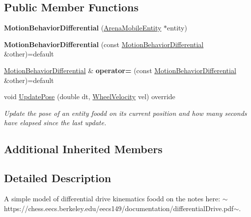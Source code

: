 \subsection*{Public Member Functions}
\begin{DoxyCompactItemize}
\item 
\mbox{\label{class_motion_behavior_differential_a8815791ac85212945862454560279d28}} 
{\bfseries Motion\+Behavior\+Differential} (\mbox{\hyperlink{class_arena_mobile_entity}{Arena\+Mobile\+Entity}} $\ast$entity)
\item 
\mbox{\label{class_motion_behavior_differential_aeaa480aac3de205e1d177c4b4ad73ed6}} 
{\bfseries Motion\+Behavior\+Differential} (const \mbox{\hyperlink{class_motion_behavior_differential}{Motion\+Behavior\+Differential}} \&other)=default
\item 
\mbox{\label{class_motion_behavior_differential_aaf4edbc2e349cb8cdbb033b16b1aef22}} 
\mbox{\hyperlink{class_motion_behavior_differential}{Motion\+Behavior\+Differential}} \& {\bfseries operator=} (const \mbox{\hyperlink{class_motion_behavior_differential}{Motion\+Behavior\+Differential}} \&other)=default
\item 
void \mbox{\hyperlink{class_motion_behavior_differential_a929c3a05aa2072acf2a508109b1259ef}{Update\+Pose}} (double dt, \mbox{\hyperlink{struct_wheel_velocity}{Wheel\+Velocity}} vel) override
\begin{DoxyCompactList}\small\item\em Update the pose of an entity foodd on its current position and how many seconds have elapsed since the last update. \end{DoxyCompactList}\end{DoxyCompactItemize}
\subsection*{Additional Inherited Members}


\subsection{Detailed Description}
A simple model of differential drive kinematics foodd on the notes here\+: $\sim$https\+://chess.eecs.\+berkeley.\+edu/eecs149/documentation/differential\+Drive.pdf$\sim$. 

